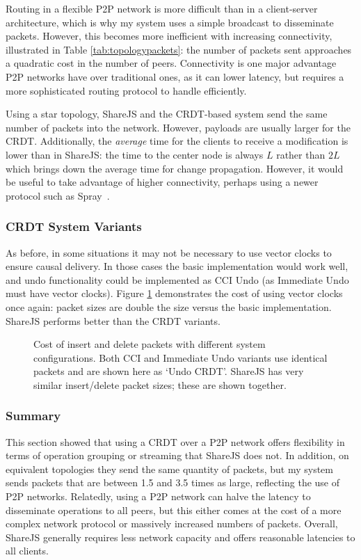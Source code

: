 \documentclass[12pt,a4paper,twoside,openright]{report}
\begin{document}
			Routing in a flexible P2P network is more difficult than in a client-server architecture, which is why my system uses a simple broadcast to disseminate packets. However, this becomes more inefficient with increasing connectivity, illustrated in Table \ref{tab:topologypackets}: the number of packets sent approaches a quadratic cost in the number of peers. Connectivity is one major advantage P2P networks have over traditional ones, as it can lower latency, but requires a more sophisticated routing protocol to handle efficiently.
			

			Using a star topology, ShareJS and the CRDT-based system send the same number of packets into the network. However, payloads are usually larger for the CRDT. Additionally, the \textit{average} time for the clients to receive a modification is lower than in ShareJS: the time to the center node is always $L$ rather than $2L$ which brings down the average time for change propagation. However, it would be useful to take advantage of higher connectivity, perhaps using a newer protocol such as Spray~\cite{nedelec2015spray}.
			
			
		\subsubsection{CRDT System Variants}
			As before, in some situations it may not be necessary to use vector clocks to ensure causal delivery. In those cases the basic implementation would work well, and undo functionality could be implemented as CCI Undo (as Immediate Undo must have vector clocks). Figure \ref{fig:sysvariationspackets} demonstrates the cost of using vector clocks once again: packet sizes are double the size versus the basic implementation. ShareJS performs better than the CRDT variants.
		
			\begin{figure}[H]
				\centering
				
				\caption[Behavior of System Variants - Packet Size] {Cost of insert and delete packets with different system configurations. Both CCI and Immediate Undo variants use identical packets and are shown here as `Undo CRDT'. ShareJS has very similar insert/delete packet sizes; these are shown together.}
				\label{fig:sysvariationspackets}
			\end{figure}
			
		
		\subsubsection{Summary}
			This section showed that using a CRDT over a P2P network offers flexibility in terms of operation grouping or streaming that ShareJS does not. In addition, on equivalent topologies they send the same quantity of packets, but my system sends packets that are between 1.5 and 3.5 times as large, reflecting the use of P2P networks. Relatedly, using a P2P network can halve the latency to disseminate operations to all peers, but this either comes at the cost of a more complex network protocol or massively increased numbers of packets. Overall, ShareJS generally requires less network capacity and offers reasonable latencies to all clients.
			
\end{document}
